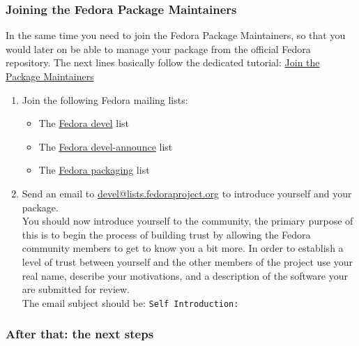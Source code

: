 \subsubsection{Joining the Fedora Package Maintainers}

In the same time you need to join the Fedora Package Maintainers, so that you would later on be able to manage your package from the official Fedora repository. 
The next lines basically follow the dedicated tutorial: \href{https://docs.fedoraproject.org/en-US/package-maintainers/Joining\_the\_Package\_Maintainers/}{Join the Package Maintainers}
\begin{enumerate}
\item Join the following Fedora mailing lists:
\begin{itemize}
\item The \href{https://lists.fedoraproject.org/archives/list/devel@lists.fedoraproject.org/}{Fedora devel} list 
\item The \href{https://lists.fedoraproject.org/admin/lists/devel-announce@lists.fedoraproject.org/}{Fedora devel-announce} list 
\item The \href{https://lists.fedoraproject.org/admin/lists/packaging@lists.fedoraproject.org/}{Fedora packaging} list 
\end{itemize}
\item Send an email to \href{mailto:devel@lists.fedoraproject.org}{devel@lists.fedoraproject.org} to introduce yourself and your package. \\[0.25cm]
You should now introduce yourself to the community, the primary purpose of this is to begin the process of building trust 
by allowing the Fedora community members to get to know you a bit more. 
In order to establish a level of trust between yourself and the other members of the project use your real name, describe your motivations, 
and a description of the software your are submitted for review. \\[0.25cm]
The email subject should be: \texttt{Self Introduction: }
\end{enumerate}

\newpage
\subsubsection{After that: the next steps}

